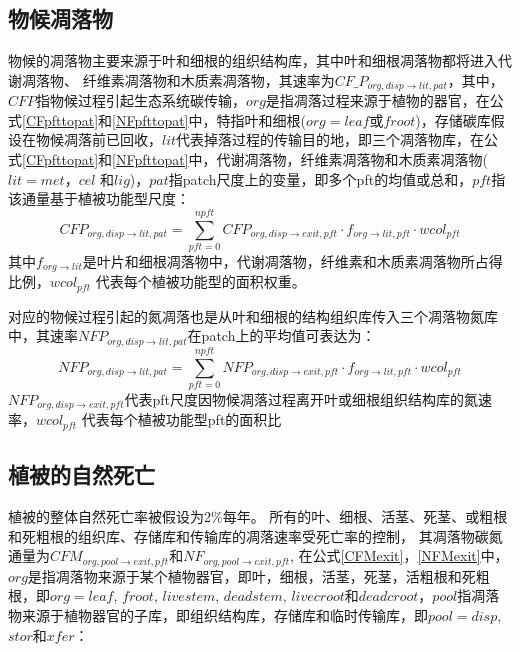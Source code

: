\subsection{物候凋落物}\label{物候凋落物}
物候的凋落物主要来源于叶和细根的组织结构库，其中叶和细根凋落物都将进入代谢凋落物、
纤维素凋落物和木质素凋落物，其速率为$CF\_P_{org,disp\rightarrow lit,pat}$，其中，$CFP$指物候过程引起生态系统碳传输，$org$是指凋落过程来源于植物的器官，在公式\eqref{CFpfttopat}和\eqref{NFpfttopat}中，特指叶和细根($org=leaf$或$froot$)，存储碳库假设在物候凋落前已回收，$lit$代表掉落过程的传输目的地，即三个凋落物库，在公式\eqref{CFpfttopat}和\eqref{NFpfttopat}中，代谢凋落物，纤维素凋落物和木质素凋落物($lit=met$，$cel$ 和$lig$)，$pat$指patch尺度上的变量，即多个pft的均值或总和，$pft$指该通量基于植被功能型尺度：
\begin{equation}\label{CFpfttopat}
  CFP_{org,disp\rightarrow lit,pat}=\sum_{pft=0}^{npft}{CFP_{org,disp \rightarrow exit,pft}\cdot f_{{org\rightarrow lit},pft}\cdot{wcol_{pft}}}
\end{equation}
其中$f_{org\rightarrow lit}$是叶片和细根凋落物中，代谢凋落物，纤维素和木质素凋落物所占得比例，${wcol_{pft}}$ 代表每个植被功能型的面积权重。

对应的物候过程引起的氮凋落也是从叶和细根的结构组织库传入三个凋落物氮库中，其速率$NFP_{org,disp\rightarrow lit,pat}$在patch上的平均值可表达为：
\begin{equation}\label{NFpfttopat}
  NFP_{org,disp\rightarrow lit,pat}=\sum_{pft=0}^{npft}{NFP_{org,disp \rightarrow exit,pft}\cdot f_{org\rightarrow lit,pft}\cdot {wcol_{pft}}}
\end{equation}
$NFP_{org,disp \rightarrow exit,pft}$代表pft尺度因物候凋落过程离开叶或细根组织结构库的氮速率，${wcol_{pft}}$ 代表每个植被功能型pft的面积比

\subsection{植被的自然死亡}\label{植被的自然死亡}
植被的整体自然死亡率被假设为2\%每年。
所有的叶、细根、活茎、死茎、或粗根和死粗根的组织库、存储库和传输库的凋落速率受死亡率的控制，
其凋落物碳氮通量为$CFM_{org,pool\rightarrow exit,pft}$和$NF_{org,pool\rightarrow exit,pft}$, 在公式\eqref{CFMexit}，\eqref{NFMexit}中，$org$是指凋落物来源于某个植物器官，即叶，细根，活茎，死茎，活粗根和死粗根，即$org=leaf$, $froot$, $livestem$, $deadstem$, $livecroot$和$deadcroot$，$pool$指凋落物来源于植物器官的子库，即组织结构库，存储库和临时传输库，即$pool=disp$,$stor$和$xfer$： 

